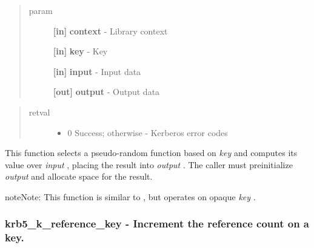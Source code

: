 \documentclass[letterpaper,10pt,english]{sphinxmanual}
\begin{document}
\begin{quote}\begin{description}
\item[{param}] \leavevmode
\textbf{{[}in{]}} \textbf{context} - Library context

\textbf{{[}in{]}} \textbf{key} - Key

\textbf{{[}in{]}} \textbf{input} - Input data

\textbf{{[}out{]}} \textbf{output} - Output data

\end{description}\end{quote}
\begin{quote}\begin{description}
\item[{retval}] \leavevmode\begin{itemize}
\item {} 
0   Success; otherwise - Kerberos error codes

\end{itemize}

\end{description}\end{quote}

This function selects a pseudo-random function based on \emph{key} and computes its value over \emph{input} , placing the result into \emph{output} . The caller must preinitialize \emph{output} and allocate space for the result.

\begin{notice}{note}{Note:}
This function is similar to {\hyperref[appdev/refs/api/krb5_c_prf:c.krb5_c_prf]{}} , but operates on opaque \emph{key} .
\end{notice}


\subsubsection{krb5\_k\_reference\_key -  Increment the reference count on a key.}
\label{appdev/refs/api/krb5_k_reference_key::doc}\label{appdev/refs/api/krb5_k_reference_key:krb5-k-reference-key-increment-the-reference-count-on-a-key}

\begin{fulllineitems}
\label{appdev/refs/api/krb5_k_reference_key:c.krb5_k_reference_key}
\end{fulllineitems}
\end{document}
